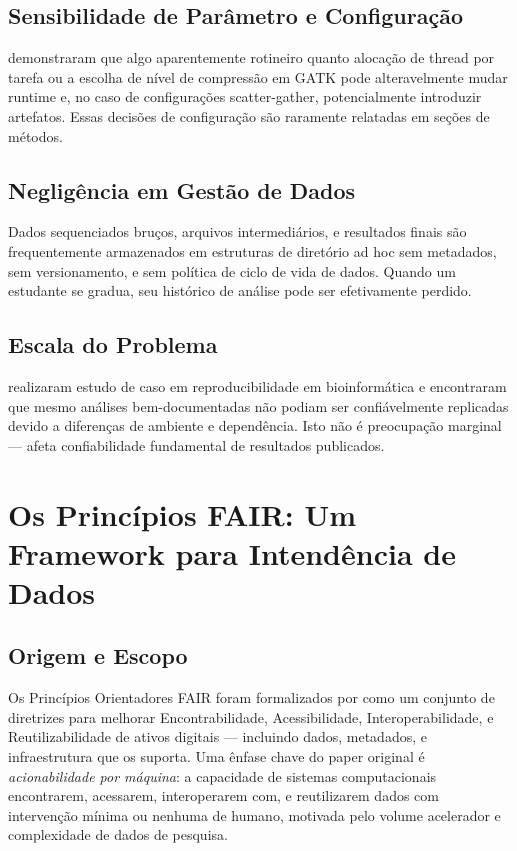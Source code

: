 \subsection{Sensibilidade de Parâmetro e Configuração}

\textcite{powers2022} demonstraram que algo aparentemente rotineiro quanto alocação de thread por tarefa ou a escolha de nível de compressão em GATK pode alteravelmente mudar runtime e, no caso de configurações scatter-gather, potencialmente introduzir artefatos. Essas decisões de configuração são raramente relatadas em seções de métodos.

\subsection{Negligência em Gestão de Dados}

Dados sequenciados bruços, arquivos intermediários, e resultados finais são frequentemente armazenados em estruturas de diretório ad hoc sem metadados, sem versionamento, e sem política de ciclo de vida de dados. Quando um estudante se gradua, seu histórico de análise pode ser efetivamente perdido.

\subsection{Escala do Problema}

\textcite{kim2018} realizaram estudo de caso em reproducibilidade em bioinformática e encontraram que mesmo análises bem-documentadas não podiam ser confiávelmente replicadas devido a diferenças de ambiente e dependência. Isto não é preocupação marginal --- afeta confiabilidade fundamental de resultados publicados.

\section{Os Princípios FAIR: Um Framework para Intendência de Dados}

\subsection{Origem e Escopo}

Os Princípios Orientadores FAIR foram formalizados por \textcite{wilkinson2016} como um conjunto de diretrizes para melhorar Encontrabilidade, Acessibilidade, Interoperabilidade, e Reutilizabilidade de ativos digitais --- incluindo dados, metadados, e infraestrutura que os suporta. Uma ênfase chave do paper original é \textit{acionabilidade por máquina}: a capacidade de sistemas computacionais encontrarem, acessarem, interoperarem com, e reutilizarem dados com intervenção mínima ou nenhuma de humano, motivada pelo volume acelerador e complexidade de dados de pesquisa.

